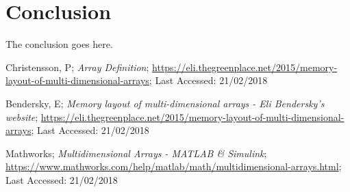 \documentclass[10pt, conference]{IEEEtran}
\begin{document}
\section{Conclusion}
\label{Conclusion}
The conclusion goes here.



\begin{thebibliography}{}

Christensson, P; \emph{Array Definition}; \url{https://eli.thegreenplace.net/2015/memory-layout-of-multi-dimensional-arrays}; Last Accessed: 21/02/2018

Bendersky, E; \emph{Memory layout of multi-dimensional arrays - Eli Bendersky's website}; \url{https://eli.thegreenplace.net/2015/memory-layout-of-multi-dimensional-arrays}; Last Accessed: 21/02/2018

Mathworks; \emph{Multidimensional Arrays - MATLAB \& Simulink}; \url{https://www.mathworks.com/help/matlab/math/multidimensional-arrays.html}; Last Accessed: 21/02/2018

\end{thebibliography}
\end{document}
